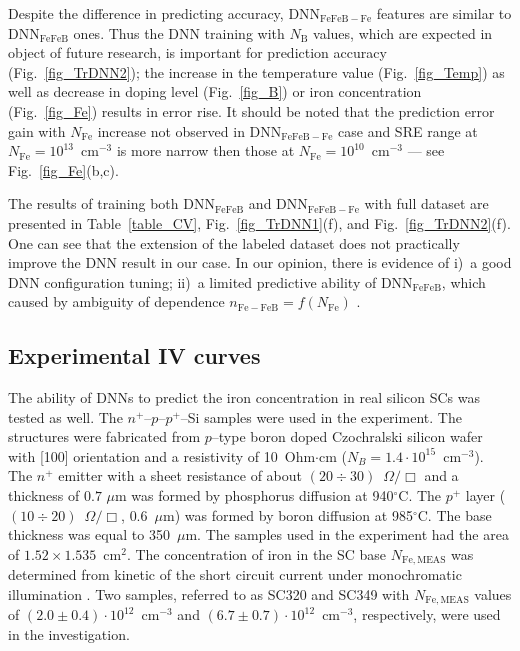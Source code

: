 \documentclass[num-refs]{wiley-article} %
\begin{document}
Despite the difference in predicting accuracy,
DNN$_\mathrm{FeFeB-Fe}$ features are similar to DNN$_\mathrm{FeFeB}$ ones.
Thus
the DNN training with $N_\mathrm{B}$ values, which are expected in object of future research,
is important for prediction accuracy (Fig.~\ref{fig_TrDNN2});
the increase in the temperature value (Fig.~\ref{fig_Temp}) as well as decrease
in doping level (Fig.~\ref{fig_B}) or iron concentration (Fig.~\ref{fig_Fe})
results in error rise.
It should be noted that the prediction error gain with $N_\mathrm{Fe}$ increase not observed in DNN$_\mathrm{FeFeB-Fe}$ case and SRE range at $N_\mathrm{Fe}=10^{13}$~cm$^{-3}$ is more narrow then those at $N_\mathrm{Fe}=10^{10}$~cm$^{-3}$ --- see Fig.~\ref{fig_Fe}(b,c).

The results of training both DNN$_\mathrm{FeFeB}$ and DNN$_\mathrm{FeFeB-Fe}$ with full dataset
are presented in Table~\ref{table_CV}, Fig.~\ref{fig_TrDNN1}(f), and Fig.~\ref{fig_TrDNN2}(f).
One can see that the extension of the labeled dataset does not practically improve the DNN result in our case.
In our opinion, there is evidence of
i)~a good DNN configuration tuning;
ii)~a limited predictive ability of DNN$_\mathrm{FeFeB}$,
which caused by ambiguity of dependence $n_\mathrm{Fe-FeB}=f(N_\mathrm{Fe})$ .

\subsection{Experimental IV curves}

The ability of DNNs to predict the iron concentration in real silicon SCs was tested as well.
The $n^+$--$p$--$p^+$--Si samples were used in the experiment.
The structures were fabricated from $p$--type boron doped Czochralski silicon wafer with [100] orientation and a resistivity of 10~Ohm$\cdot$cm ($N_B = 1.4\cdot10^{15}$~cm$^{-3}$).
The $n^+$ emitter with a sheet resistance of about $(20\div30)$~$\Omega/\Box$ and a thickness
of $0.7$ $\mu$m was formed by phosphorus diffusion at 940$^\circ$C.
The $p^+$ layer ($(10\div20)$~$\Omega/\Box$, $0.6$~$\mu$m)
was formed by boron diffusion at 985$^\circ$C.
The base thickness was equal to 350~$\mu$m.
The samples used in the experiment had the area of $1.52\times1.535$~cm$^2$.
The concentration of iron in the SC base $N_\mathrm{Fe,MEAS}$ was determined from kinetic of the short circuit current under monochromatic illumination \cite{2021CMLTP}.
Two samples, referred to as SC320 and SC349 with $N_\mathrm{Fe,MEAS}$  values
of $(2.0\pm0.4)\cdot10^{12}$~cm$^{-3}$ and $(6.7\pm0.7)\cdot10^{12}$~cm$^{-3}$,
respectively, were used in the investigation.
\end{document}
